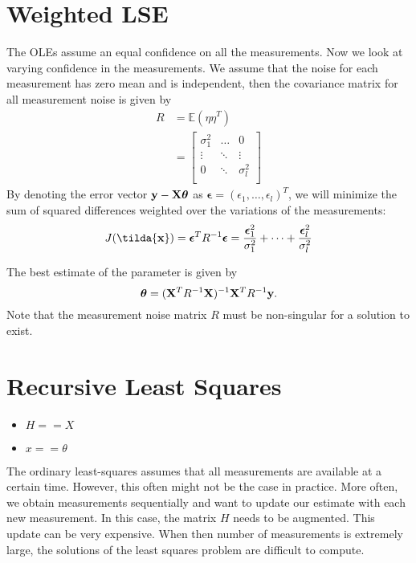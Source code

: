 \section{Weighted LSE}
The OLEs assume an equal confidence on all the measurements. Now we look at varying confidence in the measurements. We assume that the noise for each measurement has zero mean and is independent, then the covariance matrix for all measurement noise is given by
\begin{align*}
	R &= \mathbb{E}(\eta\eta^T)\\
	  &= \begin{bmatrix}
		  \sigma_1^2 & \dots & 0\\
		  \vdots & \ddots & \vdots\\
		  0 & \ddots & \sigma_l^2\\
	  \end{bmatrix}
\end{align*}
By denoting the error vector ${\mathbf{y}}-\mathbf{X}\boldsymbol{\theta}$ as $\boldsymbol{\epsilon} = (\epsilon_1, \dots, \epsilon_l)^T$, we will minimize the sum of squared differences weighted over the variations of the measurements:
$$J(\tilda{\rvx}) = \boldsymbol{\epsilon}^TR^{-1}\boldsymbol{\epsilon}=\frac{\boldsymbol{\epsilon}_1^2}{\sigma_1^2}+\dots+\frac{\boldsymbol{\epsilon}_l^2}{\sigma_l^2}$$

The best estimate of the parameter is given by
$$\boldsymbol{\theta} = (\mathbf{X}^TR^{-1}\mathbf{X})^{-1}\mathbf{X}^TR^{-1}{\mathbf{y}}.$$
Note that the measurement noise matrix $R$ must be non-singular for a solution to exist.

\section{Recursive Least Squares}
\label{sec:recursive_least_square}

\begin{itemize}
	\item $H==X$
	\item $x==\theta$
\end{itemize}

The ordinary least-squares assumes that all measurements are available at a certain time. However, this often might not be the case in practice. More often, we obtain measurements sequentially and want to update our estimate with each new measurement. In this case, the matrix $H$ needs to be augmented. This update can be very expensive. When then number of measurements is extremely large, the solutions of the least squares problem are difficult to compute. 

